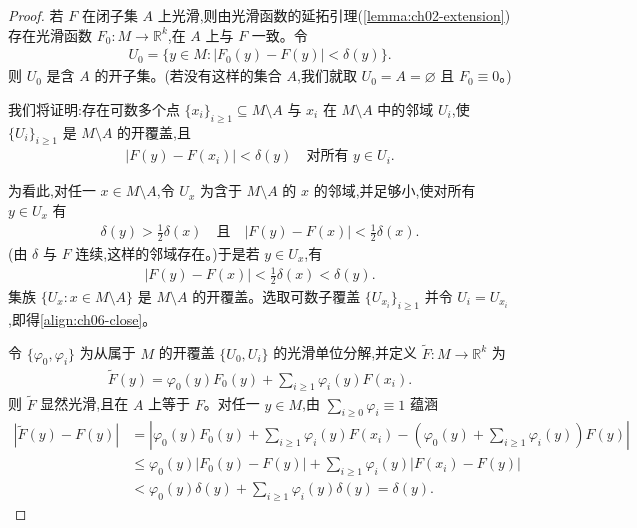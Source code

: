 \documentclass[../../main.tex]{subfiles}
\begin{document}
\begin{proof}
若 $F$ 在闭子集 $A$ 上光滑,则由光滑函数的延拓引理(\cref{lemma:ch02-extension})存在光滑函数 $F_0:M\to\mathbb{R}^k$,在 $A$ 上与 $F$ 一致。令
\begin{align*}
U_0=\{y\in M:|F_0(y)-F(y)|<\delta(y)\}.
\end{align*}
则 $U_0$ 是含 $A$ 的开子集。(若没有这样的集合 $A$,我们就取 $U_0=A=\varnothing$ 且 $F_0\equiv 0$。)

我们将证明:存在可数多个点 $\{x_i\}_{i\geqslant 1}\subseteq M\setminus A$ 与 $x_i$ 在 $M\setminus A$ 中的邻域 $U_i$,使 $\{U_i\}_{i\geqslant 1}$ 是 $M\setminus A$ 的开覆盖,且
\begin{align}\label{align:ch06-close}
|F(y)-F(x_i)|<\delta(y)\quad\text{对所有 }y\in U_i.
\end{align}

为看此,对任一 $x\in M\setminus A$,令 $U_x$ 为含于 $M\setminus A$ 的 $x$ 的邻域,并足够小,使对所有 $y\in U_x$ 有
\begin{align*}
\delta(y)>\tfrac12\delta(x)\quad\text{且}\quad |F(y)-F(x)|<\tfrac12\delta(x).
\end{align*}
(由 $\delta$ 与 $F$ 连续,这样的邻域存在。)于是若 $y\in U_x$,有
\begin{align*}
|F(y)-F(x)|<\tfrac12\delta(x)<\delta(y).
\end{align*}
集族 $\{U_x:x\in M\setminus A\}$ 是 $M\setminus A$ 的开覆盖。选取可数子覆盖 $\{U_{x_i}\}_{i\geqslant 1}$ 并令 $U_i=U_{x_i}$,即得\eqref{align:ch06-close}。

令 $\{\varphi_0,\varphi_i\}$ 为从属于 $M$ 的开覆盖 $\{U_0,U_i\}$ 的光滑单位分解,并定义 $\widetilde{F}:M\to\mathbb{R}^k$ 为
\begin{align*}
\widetilde{F}(y)=\varphi_0(y)F_0(y)+\sum_{i\geqslant 1}\varphi_i(y)F(x_i).
\end{align*}
则 $\widetilde{F}$ 显然光滑,且在 $A$ 上等于 $F$。对任一 $y\in M$,由 $\sum_{i\geqslant 0}\varphi_i\equiv 1$ 蕴涵
\begin{align*}
|\widetilde{F}(y)-F(y)|
&=\left|\varphi_0(y)F_0(y)+\sum_{i\geqslant 1}\varphi_i(y)F(x_i)-\left(\varphi_0(y)+\sum_{i\geqslant 1}\varphi_i(y)\right)F(y)\right|\\
&\leqslant \varphi_0(y)|F_0(y)-F(y)|+\sum_{i\geqslant 1}\varphi_i(y)|F(x_i)-F(y)|\\
&<\varphi_0(y)\delta(y)+\sum_{i\geqslant 1}\varphi_i(y)\delta(y)=\delta(y).
\end{align*}
\end{proof}
\end{document}
